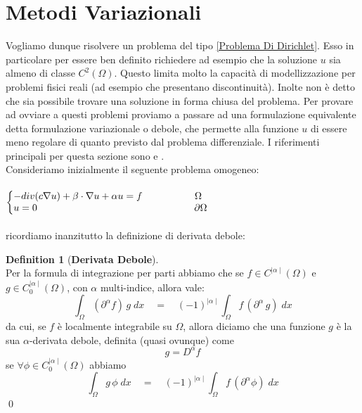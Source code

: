 \documentclass[12pt,a4paper]{report}
\makeatletter
\theoremstyle{theorem}
\theoremstyle{definition}
\newtheorem{definition}{Definition}[section]
\newenvironment{system}
{\left\lbrace\begin{array}{@{}l@{}}}
{\end{array}\right.}
\makeatother
\begin{document}
\section{Metodi Variazionali}
Vogliamo dunque risolvere un problema del tipo \ref{Problema Di Dirichlet}. Esso in particolare per essere ben definito richiedere ad esempio che la soluzione $u$ sia almeno di classe $C^2(\Omega)$. Questo limita molto la capacità di modellizzazione per problemi fisici reali (ad esempio che presentano discontinuità). Inolte non è detto che sia possibile trovare una soluzione in forma chiusa del problema. Per provare ad ovviare a questi problemi proviamo a passare ad una formulazione equivalente detta formulazione variazionale o debole, che permette alla funzione $u$ di essere meno regolare di quanto previsto dal problema differenziale. I riferimenti principali per questa sezione sono \cite{Brezis} e \cite{Evans}.\\
Consideriamo inizialmente il seguente problema omogeneo:\\\\
 \label{Problema Di Dirichlet Omogeneo}
\begin{math}
\begin{system}
-div(c\nabla{u})+\beta \cdot \nabla{u} + \alpha u = f \qquad \qquad \quad \ \Omega \\
u = 0 \quad \qquad \qquad \qquad \qquad \qquad \qquad \qquad \quad \partial \Omega \\
\end{system}
\end{math}
\hfill \\\\
ricordiamo inanzitutto la definizione di derivata debole:
\begin{definition} [\textbf{Derivata Debole}]   \label{Derivata Debole}
\hfill \\
Per la formula di integrazione per parti abbiamo che se $f \in C^{\mid \alpha \mid}(\Omega)$ e $g \in C_{0}^{\mid \alpha \mid}(\Omega)$, con $\alpha$ multi-indice, allora vale:
\[ \int_{\Omega} { (\partial^{\alpha} f) \, g \; dx } \quad = \quad (-1)^{\mid \alpha \mid} \int_{\Omega} { f \, (\partial^{\alpha} \, g) \;dx } \]
da cui, se $f$ è localmente integrabile su $\Omega$, allora diciamo che una funzione $g$ è la sua $\alpha$-derivata debole, definita (quasi ovunque) come
\[ g = D^{ \alpha }f \]
se $\forall \phi \in  C_{0}^{\mid \alpha \mid}(\Omega)$ abbiamo
\[ \int_{\Omega} { g \, \phi \; dx } \quad = \quad (-1)^{\mid \alpha \mid} \int_{\Omega} { f \, (\partial^{\alpha} \phi) \; dx} \]
\qed
\end{definition}
\end{document}
